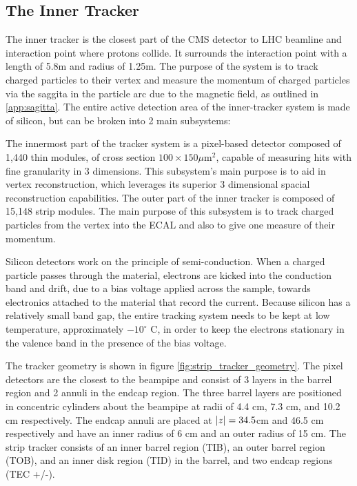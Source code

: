   \subsection{The Inner Tracker} \label{sec:inner_tracker}
    The inner tracker is the closest part of the CMS detector to LHC beamline and interaction point where protons collide. \cite{cms_jinst} It surrounds the interaction point with a length of 5.8m and radius of 1.25m. The purpose of the system is to track charged particles to their vertex and measure the momentum of charged particles via the saggita in the particle arc due to the magnetic field, as outlined in \ref{app:sagitta}. The entire active detection area of the inner-tracker system is made of silicon, but can be broken into 2 main subsystems:

    \begin{enumerate}
       The innermost part of the tracker system is a pixel-based detector composed of 1,440 thin modules, of cross section $100 \times 150 \mu$m$^2$, capable of measuring hits with fine granularity in 3 dimensions. This subsystem's main purpose is to aid in vertex reconstruction, which leverages its superior 3 dimensional spacial reconstruction capabilities.
       The outer part of the inner tracker is composed of 15,148 strip modules. The main purpose of this subsystem is to track charged particles from the vertex into the ECAL and also to give one measure of their momentum.
    \end{enumerate}

    Silicon detectors work on the principle of semi-conduction. When a charged particle passes through the material, electrons are kicked into the conduction band and drift, due to a bias voltage applied across the sample, towards electronics attached to the material that record the current. Because silicon has a relatively small band gap, the entire tracking system needs to be kept at low temperature, approximately $-10^\circ$ C, in order to keep the electrons stationary in the valence band in the presence of the bias voltage.

    The tracker geometry is shown in figure \ref{fig:strip_tracker_geometry}. The pixel detectors are the closest to the beampipe and consist of 3 layers in the barrel region and 2 annuli in the endcap region. The three barrel layers are positioned in concentric cylinders about the beampipe at radii of 4.4 cm, 7.3 cm, and 10.2 cm respectively. The endcap annuli are placed at $\lvert z \rvert = 34.5 $cm and 46.5 cm respectively and have an inner radius of 6 cm and an outer radius of 15 cm. The strip tracker consists of an inner barrel region (TIB), an outer barrel region (TOB), and an inner disk region (TID) in the barrel, and two endcap regions (TEC +/-). 

